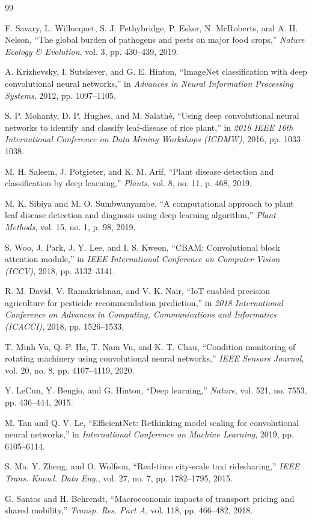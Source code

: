 \documentclass[conference]{IEEEtran}
\begin{document}
\begin{thebibliography}{99}

 F. Savary, L. Willocquet, S. J. Pethybridge, P. Esker, N. McRoberts, and A. H. Nelson, ``The global burden of pathogens and pests on major food crops,'' \textit{Nature Ecology \& Evolution}, vol. 3, pp. 430--439, 2019.

 A. Krizhevsky, I. Sutskever, and G. E. Hinton, ``ImageNet classification with deep convolutional neural networks,'' in \textit{Advances in Neural Information Processing Systems}, 2012, pp. 1097--1105.

 S. P. Mohanty, D. P. Hughes, and M. Salathé, ``Using deep convolutional neural networks to identify and classify leaf-disease of rice plant,'' in \textit{2016 IEEE 16th International Conference on Data Mining Workshops (ICDMW)}, 2016, pp. 1033--1038.

 M. H. Saleem, J. Potgieter, and K. M. Arif, ``Plant disease detection and classification by deep learning,'' \textit{Plants}, vol. 8, no. 11, p. 468, 2019.

 M. K. Sibiya and M. O. Sumbwanyambe, ``A computational approach to plant leaf disease detection and diagnosis using deep learning algorithm,'' \textit{Plant Methods}, vol. 15, no. 1, p. 98, 2019.

 S. Woo, J. Park, J. Y. Lee, and I. S. Kweon, ``CBAM: Convolutional block attention module,'' in \textit{IEEE International Conference on Computer Vision (ICCV)}, 2018, pp. 3132--3141.

 R. M. David, V. Ramakrishnan, and V. K. Nair, ``IoT enabled precision agriculture for pesticide recommendation prediction,'' in \textit{2018 International Conference on Advances in Computing, Communications and Informatics (ICACCI)}, 2018, pp. 1526--1533.

 T. Minh Vu, Q.-P. Ha, T. Nam Vu, and K. T. Chau, ``Condition monitoring of rotating machinery using convolutional neural networks,'' \textit{IEEE Sensors Journal}, vol. 20, no. 8, pp. 4107--4119, 2020.

 Y. LeCun, Y. Bengio, and G. Hinton, ``Deep learning,'' \textit{Nature}, vol. 521, no. 7553, pp. 436--444, 2015.

 M. Tan and Q. V. Le, ``EfficientNet: Rethinking model scaling for convolutional neural networks,'' in \textit{International Conference on Machine Learning}, 2019, pp. 6105--6114.

 S. Ma, Y. Zheng, and O. Wolfson, ``Real-time city-scale taxi ridesharing,'' \textit{IEEE Trans. Knowl. Data Eng.}, vol. 27, no. 7, pp. 1782--1795, 2015.

 G. Santos and H. Behrendt, ``Macroeconomic impacts of transport pricing and shared mobility,'' \textit{Transp. Res. Part A}, vol. 118, pp. 466--482, 2018.

\end{thebibliography}
\end{document}
